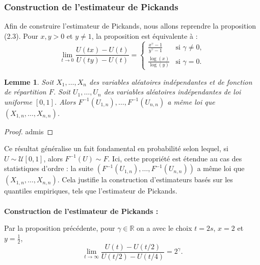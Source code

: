 \documentclass{article}
\theoremstyle{plain}
\theoremstyle{definition}
\theoremstyle{plain}
\newtheorem{lemma}[definition]{Lemme}
\begin{document}
\subsubsection{Construction de l'estimateur de Pickands}

\noindent Afin de construire l'estimateur de Pickands, nous allons reprendre la proposition (2.3). Pour \(x,y > 0\) et \(y \neq 1\), la proposition est équivalente à :
\[
\lim_{t \to 0} \frac{U(tx) - U(t)}{U(ty) - U(t)} = 
\begin{cases} 
\frac{x^\gamma - 1}{y^\gamma - 1} & \text{si } \gamma \neq 0, \\
\frac{\log(x)}{\log(y)} & \text{si } \gamma = 0.
\end{cases}
\]
\newline

\begin{lemma}
Soit \(X_1, \dots, X_n\) des variables aléatoires indépendantes et de fonction de répartition \(F\).
Soit \(U_1, \dots, U_n\) des variables aléatoires indépendantes de loi uniforme \(\left[0,1\right]\). Alors \(F^{-1}(U_{1,n}), \dots, F^{-1}(U_{n,n})\) a même loi que \((X_{1,n}, \dots, X_{n,n})\).
\end{lemma}

\begin{proof}
admis
\end{proof}
\noindent
Ce résultat généralise un fait fondamental en probabilité selon lequel, si \(U \sim \mathcal{U}[0,1]\), alors \(F^{-1}(U) \sim F\). Ici, cette propriété est étendue au cas des statistiques d'ordre : la suite \((F^{-1}(U_{1,n}), \dots, F^{-1}(U_{n,n}))\) a même loi que \((X_{1,n}, \dots, X_{n,n})\). Cela justifie la construction d’estimateurs basés sur les quantiles empiriques, tels que l’estimateur de Pickands.
\\
\\
\noindent \textbf{Construction de l'estimateur de Pickands :}

\noindent Par la proposition précédente, pour $\gamma \in \mathbb{R}$ on a avec le choix $t = 2s$, $x = 2$ et $y = \frac{1}{2}$,
\[
\lim_{t \to \infty} \frac{U(t) - U(t/2)}{U(t/2) - U(t/4)} = 2^{\gamma}.
\]
\end{document}
